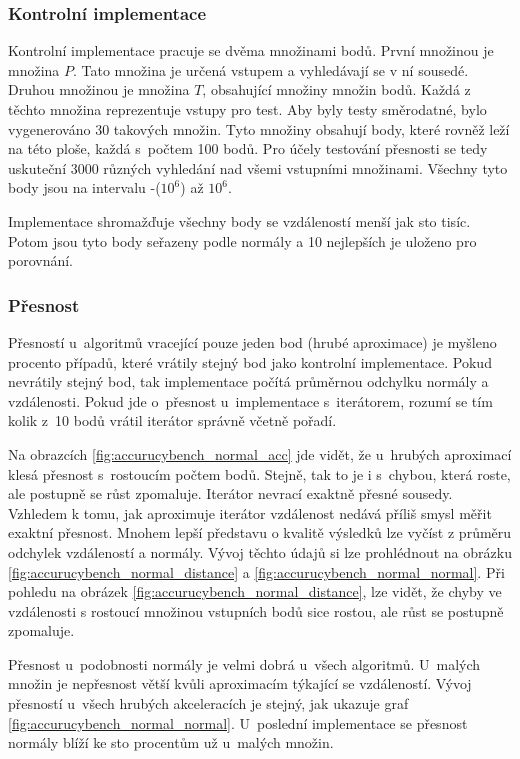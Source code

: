 \subsubsection{Kontrolní implementace}
Kontrolní implementace pracuje se dvěma množinami bodů. První množinou je množina $P$. Tato množina je určená vstupem a vyhledávají se v ní sousedé. Druhou množinou je množina $T$, obsahující množiny množin bodů. Každá z těchto množina reprezentuje vstupy pro test. Aby byly testy směrodatné, bylo vygenerováno 30 takových množin. Tyto množiny obsahují body, které rovněž leží na této ploše, každá s~počtem 100 bodů. Pro účely testování přesnosti se tedy uskuteční $3000$ různých vyhledání nad všemi vstupními množinami. Všechny tyto body jsou na intervalu -($10^6$) až $10^6$. 

Implementace shromažďuje všechny body se vzdáleností menší jak sto tisíc. Potom jsou tyto body seřazeny podle normály a 10 nejlepších je uloženo pro porovnání. 

\subsubsection{Přesnost}
Přesností u~algoritmů vracející pouze jeden bod (hrubé aproximace) je myšleno procento případů, které vrátily stejný bod jako kontrolní implementace. Pokud nevrátily stejný bod, tak implementace počítá průměrnou odchylku normály a vzdálenosti. Pokud jde o~přesnost u~implementace s~iterátorem, rozumí se tím kolik z~10 bodů vrátil iterátor správně včetně pořadí. 

Na obrazcích \ref{fig:accurucybench_normal_acc} jde vidět, že u~hrubých aproximací klesá přesnost s~rostoucím počtem bodů. Stejně, tak to je i s~chybou, která roste, ale postupně se růst zpomaluje. Iterátor nevrací exaktně přesné sousedy. Vzhledem k tomu, jak aproximuje iterátor vzdálenost nedává příliš smysl měřit exaktní přesnost. Mnohem lepší představu o kvalitě výsledků lze vyčíst z průměru odchylek vzdáleností a normály. Vývoj těchto údajů si lze prohlédnout na obrázku \ref{fig:accurucybench_normal_distance} a \ref{fig:accurucybench_normal_normal}. Při pohledu na obrázek \ref{fig:accurucybench_normal_distance}, lze vidět, že chyby ve vzdálenosti s rostoucí množinou vstupních bodů sice rostou, ale růst se postupně zpomaluje. 

Přesnost u~podobnosti normály je velmi dobrá u~všech algoritmů. U~malých množin je nepřesnost větší kvůli aproximacím týkající se vzdáleností. Vývoj přesností u~všech hrubých akceleracích je stejný, jak ukazuje graf \ref{fig:accurucybench_normal_normal}. U~poslední implementace se přesnost normály blíží ke sto procentům už u~malých množin.

